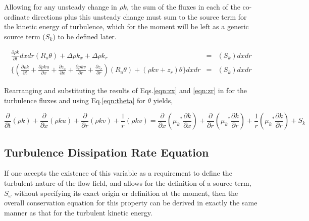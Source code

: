 	Allowing for any unsteady change in $\rho k$, the sum of the fluxes in 
each of the co-ordinate directions plus this unsteady change must sum to the source term for the kinetic energy of
turbulence, which for the moment will be left as a generic source term ($S_k$) to be defined later.

\begin{displaymath}
	\begin{array}{ccc}
	\frac{\partial \rho k}{\partial t}dxdr(R_o \theta) + \Delta \rho k_x + \Delta \rho k_r & = & (S_k)dxdr \\
	\Big\{(\frac{\partial \rho k}{\partial t} + \frac{\partial \rho k u}{\partial x} 
	+ \frac{\partial z_x}{\partial x}
	+  \frac{\partial \rho k v}{\partial r} + \frac{\partial z_r}{\partial r})(R_o \theta) + 
	(\rho k v + z_r)\theta \Big\}dxdr & = & (S_k)dxdr
	\end{array}
\end{displaymath}

	Rearranging and substituting the results of Eqs.\ref{eqn:zx} and \ref{eqn:zr} in for the turbulence fluxes and
using Eq.\ref{eqn:theta} for $\theta$ yields,

\begin{equation}
	\frac{\partial}{\partial t}(\rho k) + \frac{\partial}{\partial x}(\rho k u) + \frac{\partial}{\partial r}(\rho k v)
	+ \frac {1}{r}(\rho k v) = \frac{\partial}{\partial x}({\mu_k}^* \frac{\partial k}{\partial x}) 
	+ \frac{\partial}{\partial r}({\mu_k}^* \frac{\partial k}{\partial r}) 
	+ \frac {1}{r}({\mu_k}^* \frac{\partial k}{\partial r}) + S_k
\label{eqn:tkefinal}
\end{equation}

\subsection{Turbulence Dissipation Rate Equation}

	If one accepts the existence of this variable as a requirement to define the turbulent nature of the flow field,
and allows for the definition of a source term, $S_\omega$ without specifying its exact origin or definition at the moment,
then the overall conservation equation for this property can be derived in exactly the same manner as that for the 
turbulent kinetic energy.

